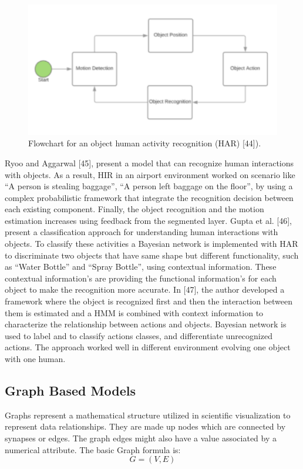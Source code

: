 \begin{figure}[ht]
\centering
\includegraphics{Figures/ht1}
\decoRule
\caption[Flowchart for an object human activity recognition (HAR) "44"]{Flowchart for an object human activity recognition (HAR) [44]).}
\label{fig:la}
\end{figure}
Ryoo and Aggarwal [45], present a model that can recognize human interactions with objects. As a result, HIR in an airport environment worked on scenario like “A person is stealing baggage”, “A person left baggage on the floor”, by using a complex probabilistic framework that integrate the recognition decision between each existing component. Finally, the object recognition and the motion estimation increases using feedback from the segmented layer. Gupta et al. [46], present a classification approach for understanding human interactions with objects. To classify these activities a Bayesian network is implemented with HAR to discriminate two objects that have same shape but different functionality, such as “Water Bottle” and “Spray Bottle”, using contextual information. These contextual information’s are providing the functional information’s for each object to make the recognition more accurate. In [47], the author developed a framework where the object is recognized first and then the interaction between them is estimated and a HMM is combined with context information to characterize the relationship between actions and objects. Bayesian network is used to label and to classify actions classes, and differentiate unrecognized actions. The approach worked well in different environment evolving one object with one human.

\subsection{Graph Based Models}
\hspace{5mm} Graphs represent a mathematical structure utilized in scientific visualization to represent data relationships. They are made up nodes which are connected by synapses or edges. The graph edges might also have a value associated by a numerical attribute.  
The basic Graph formula is:
\begin{equation}
    G = (V, E)
\end{equation}



